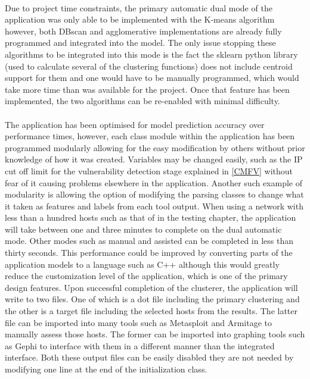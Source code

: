 \paragraph{}Due to project time constraints, the primary automatic dual mode of the application was only able to be implemented with the K-means algorithm however, both DBscan and agglomerative implementations are already fully programmed and integrated into the model. The only issue stopping these algorithms to be integrated into this mode is the fact the sklearn python library (used to calculate several of the clustering functions) does not include centroid support for them and one would have to be manually programmed, which would take more time than was available for the project. Once that feature has been implemented, the two algorithms can be re-enabled with minimal difficulty.

\paragraph{}The application has been optimised for model prediction accuracy over performance times, however, each class module within the application has been programmed modularly allowing for the easy modification by others without prior knowledge of how it was created. Variables may be changed easily, such as the IP cut off limit for the vulnerability detection stage explained in \ref{CMFV} without fear of it causing problems elsewhere in the application. Another such example of modularity is allowing the option of modifying the parsing classes to change what it taken as features and labels from each tool output. When using a network with less than a hundred hosts such as that of in the testing chapter, the application will take between one and three minutes to complete on the dual automatic mode. Other modes such as manual and assisted can be completed in less than thirty seconds. This performance could be improved by converting parts of the application models to a language such as C++ although this would greatly reduce the customization level of the application, which is one of the primary design features. Upon successful completion of the clusterer, the application will write to two files. One of which is a dot file including the primary clustering and the other is a target file including the selected hosts from the results. The latter file can be imported into many tools such as Metasploit and Armitage to manually assess those hosts. The former can be imported into graphing tools such as Gephi to interface with them in a different manner than the integrated interface. Both these output files can be easily disabled they are not needed by modifying one line at the end of the initialization class.

